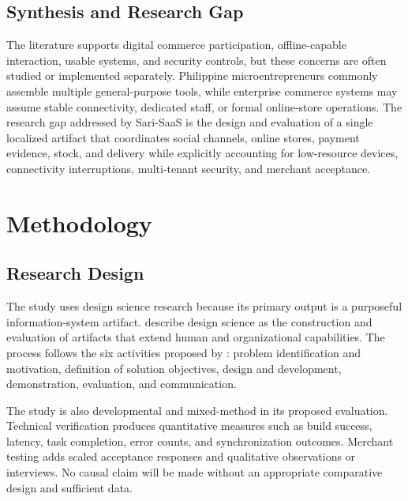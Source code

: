 \documentclass[12pt,oneside]{report}
\begin{document}
\section{Synthesis and Research Gap}
The literature supports digital commerce participation, offline-capable
interaction, usable systems, and security controls, but these concerns are often
studied or implemented separately. Philippine microentrepreneurs commonly
assemble multiple general-purpose tools, while enterprise commerce systems may
assume stable connectivity, dedicated staff, or formal online-store operations.
The research gap addressed by Sari-SaaS is the design and evaluation of a single
localized artifact that coordinates social channels, online stores, payment
evidence, stock, and delivery while explicitly accounting for low-resource
devices, connectivity interruptions, multi-tenant security, and merchant
acceptance.

\chapter{Methodology}

\section{Research Design}
The study uses design science research because its primary output is a purposeful
information-system artifact. \textcite{hevner2004designscience} describe design
science as the construction and evaluation of artifacts that extend human and
organizational capabilities. The process follows the six activities proposed by
\textcite{peffers2007dsrm}: problem identification and motivation, definition of
solution objectives, design and development, demonstration, evaluation, and
communication.

The study is also developmental and mixed-method in its proposed evaluation.
Technical verification produces quantitative measures such as build success,
latency, task completion, error counts, and synchronization outcomes. Merchant
testing adds scaled acceptance responses and qualitative observations or
interviews. No causal claim will be made without an appropriate comparative
design and sufficient data.
\end{document}
